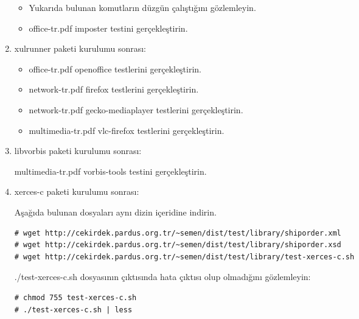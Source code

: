 \documentclass[a4paper,10pt]{article}
\begin{document}
\begin{enumerate}
\begin{itemize}
\item  Yukarıda bulunan komutların düzgün çalıştığını gözlemleyin.
\item office-tr.pdf imposter testini gerçekleştirin.
\end{itemize}

\item xulrunner paketi kurulumu sonrası:
\begin{itemize}
\item office-tr.pdf openoffice testlerini gerçekleştirin.
\item network-tr.pdf firefox testlerini gerçekleştirin.
\item network-tr.pdf gecko-mediaplayer testlerini gerçekleştirin.
\item multimedia-tr.pdf vlc-firefox testlerini gerçekleştirin.
\end{itemize}

\item libvorbis paketi kurulumu sonrası:

multimedia-tr.pdf vorbis-tools testini gerçekleştirin.

\item xerces-c paketi kurulumu sonrası:

Aşağıda bulunan dosyaları aynı dizin içeridine indirin.
\begin{verbatim}
# wget http://cekirdek.pardus.org.tr/~semen/dist/test/library/shiporder.xml
# wget http://cekirdek.pardus.org.tr/~semen/dist/test/library/shiporder.xsd
# wget http://cekirdek.pardus.org.tr/~semen/dist/test/library/test-xerces-c.sh
\end{verbatim}

./test-xerces-c.sh dosyasının çıktısında hata çıktısı olup olmadığını gözlemleyin:
\begin{verbatim}
# chmod 755 test-xerces-c.sh
# ./test-xerces-c.sh | less
\end{verbatim}


\end{enumerate}
\end{document}
